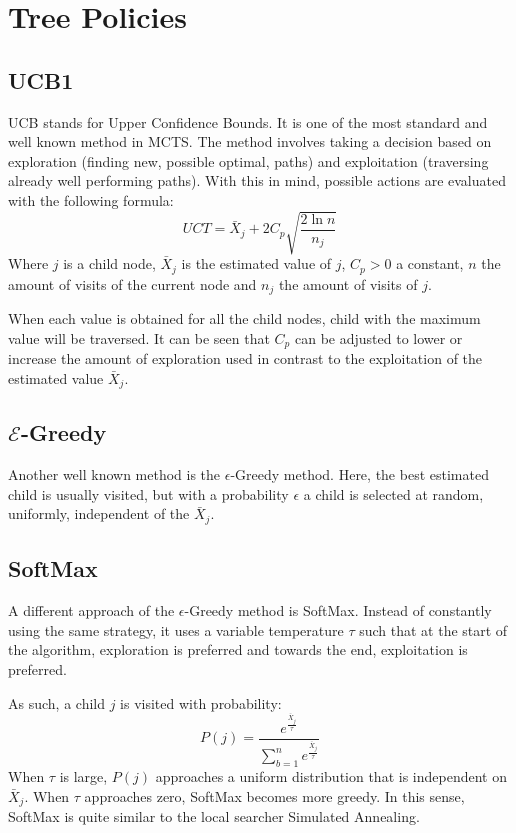 \section{Tree Policies} 

\subsection{UCB1}
UCB stands for Upper Confidence Bounds. It is one of the most standard and well known method in MCTS. The method involves taking a decision based on exploration (finding new, possible optimal, paths) and exploitation (traversing already well performing paths). With this in mind, possible actions are evaluated with the following formula:
\begin{equation}
UCT = \bar{X}_j + 2 C_p\sqrt{\frac{2 \ln n}{n_j}}
\end{equation}
Where $j$ is a child node, $\bar{X}_j$ is the estimated value of $j$, $C_p > 0$ a constant, $n$ the amount of visits of the current node and $n_j$ the amount of visits of $j$.

When each value is obtained for all the child nodes, child with the maximum value will be traversed. It can be seen that $C_p$ can be adjusted to lower or increase the amount of exploration used in contrast to the exploitation of the estimated value $\bar{X}_j$.

\subsection{$\mathcal{E}$-Greedy}

Another well known method is the $\epsilon$-Greedy method. Here, the best estimated child is usually visited, but with a probability $\epsilon$ a child is selected at random, uniformly, independent of the $\bar{X}_j$.

\subsection{SoftMax}
A different approach of the $\epsilon$-Greedy method is SoftMax. Instead of constantly using the same strategy, it uses a variable temperature $\tau$ such that at the start of the algorithm, exploration is preferred and towards the end, exploitation is preferred. 

As such, a child $j$ is visited with probability:
\begin{equation}
P(j) = \frac{e^\frac{\bar{X}_j}{\tau}}{\sum_{b=1}^{n} e^\frac{\bar{X}_j}{\tau}}
\end{equation}
When $\tau$ is large, $P(j)$ approaches a uniform distribution that is independent on $\bar{X}_j$. When $\tau$ approaches zero, SoftMax becomes more greedy. In this sense, SoftMax is quite similar to the local searcher Simulated Annealing.